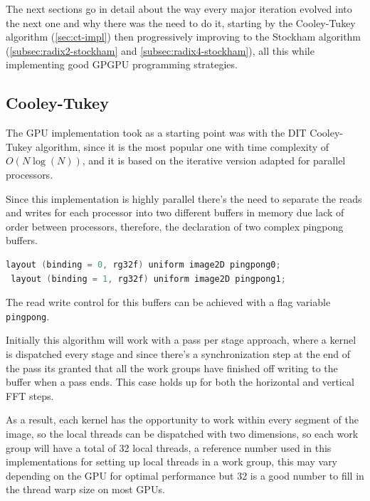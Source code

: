 \documentclass[
  oneside,
  11pt, a4paper,
  footinclude=true,
  headinclude=true,
  cleardoublepage=empty
]{scrbook}
\begin{document}
The next sections go in detail about the way every major iteration evolved into the next one and why there was the need to do it, starting by the Cooley-Tukey algorithm (\autoref{sec:ct-impl}) then progressively improving to the Stockham algorithm (\autoref{subsec:radix2-stockham} and \autoref{subsec:radix4-stockham}), all this while implementing good GPGPU programming strategies.


\subsection{Cooley-Tukey} \label{sec:ct-impl}


The GPU implementation took as a starting point was with the DIT Cooley-Tukey algorithm, since it is the most popular one with time complexity of $O(N\log{(N)})$, and it is based on the iterative version adapted for parallel processors.

Since this implementation is highly parallel there's the need to separate the reads and writes for each processor into two different buffers in memory due lack of order between processors, therefore, the declaration of two complex pingpong buffers.

\begin{lstlisting}[language=C, caption={Input buffer bindings}]
 layout (binding = 0, rg32f) uniform image2D pingpong0;
 layout (binding = 1, rg32f) uniform image2D pingpong1;
\end{lstlisting}

The read write control for this buffers can be achieved with a flag variable \texttt{pingpong}.

Initially this algorithm will work with a pass per stage approach, where a kernel is dispatched every stage and since there's a synchronization step at the end of the pass its granted that all the work groups have finished off writing to the buffer when a pass ends. This case holds up for both the horizontal and vertical FFT steps.

As a result, each kernel has the opportunity to work within every segment of the image, so the local threads can be dispatched with two dimensions, so each work group will have a total of 32 local threads, a reference number used in this implementations for setting up local threads in a work group, this may vary depending on the GPU for optimal performance but 32 is a good number to fill in the thread warp size on most GPUs.
\end{document}
